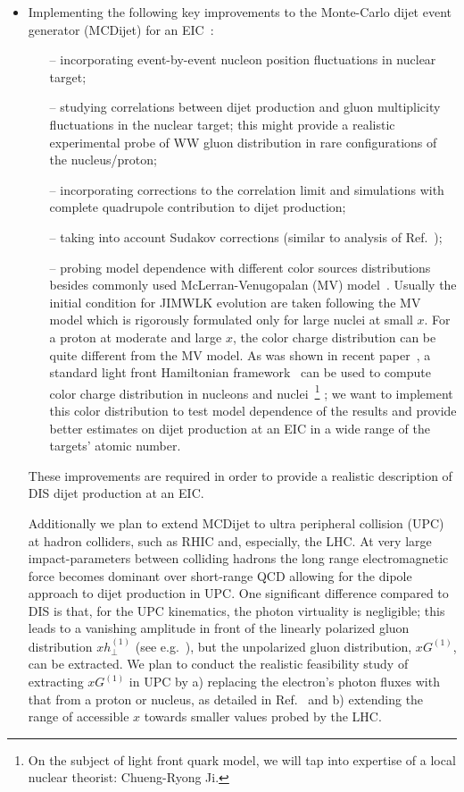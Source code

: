 \begin{itemize}
			\item 
				Implementing the following key improvements to the Monte-Carlo dijet event generator (MCDijet) 
				for an EIC~\cite{TODO}:
				\begin{itemize}
					\item[--] incorporating event-by-event nucleon position fluctuations in nuclear target; 
					\item[--] studying correlations between dijet production and gluon multiplicity fluctuations 
						in the nuclear target; this might provide a realistic experimental probe 
						of WW gluon distribution in rare configurations of the nucleus/proton;
					\item[--] incorporating corrections to the correlation limit and simulations with complete 
						quad\-rupole contribution to dijet production; 
					\item[--] taking into account Sudakov corrections (similar to analysis of Ref.~\cite{Zheng:2014vka});  
					\item[--] probing model dependence with different color sources distributions 
						besides commonly used McLerran-Venugopalan (MV) model~\cite{McLerran:1993ni}. 
						Usually the initial condition for JIM\-WLK evolution are taken following 
						the MV model which is rigorously formulated only for large nuclei at 
						small $x$. For a proton at moderate and large $x$, the color charge 
						distribution can be quite different from the MV model. 
						As was shown in recent paper~\cite{Dumitru:2018vpr}, a
						standard light front Hamiltonian framework~\cite{Brodsky:1997de} can be used to compute color charge 
						distribution in nucleons and nuclei~\footnote{On the subject of light front quark model, 
							we will tap into expertise of a local nuclear theorist: Chueng-Ryong Ji.}  		
							; we want to implement this color distribution 
						to test model dependence of the results and provide better estimates on 
						dijet production at an EIC in a wide range of the targets' atomic number.    
				\end{itemize}
				These improvements are required in order to provide a realistic description of DIS
				dijet production at an EIC. 

				Additionally we plan to extend MCDijet to ultra peripheral collision  (UPC) at hadron 
				colliders, such as RHIC and, especially, the LHC. 
				At very large impact-parameters between colliding hadrons the long range electromagnetic
				force becomes dominant over short-range QCD allowing for the dipole approach to 
				dijet production in UPC. One significant difference compared to DIS is that, for
				the UPC kinematics, the photon virtuality  is negligible; 
				this leads to a vanishing amplitude in front of the linearly polarized gluon 
				distribution $x h^{(1)}_\perp$ (see e.g.~\cite{Dominguez:2011br}), 
				but the unpolarized gluon distribution, $xG^{(1)}$,  can be extracted. 
				We plan to conduct the realistic feasibility study of extracting  $xG^{(1)}$ in UPC 
				by 
				a) replacing the electron's photon fluxes with that from a proton or nucleus, as detailed in 
				Ref.~\cite{Klein:1999gv}
				and b) extending the range of accessible $x$ towards smaller values probed by  the LHC. 


\end{itemize}
